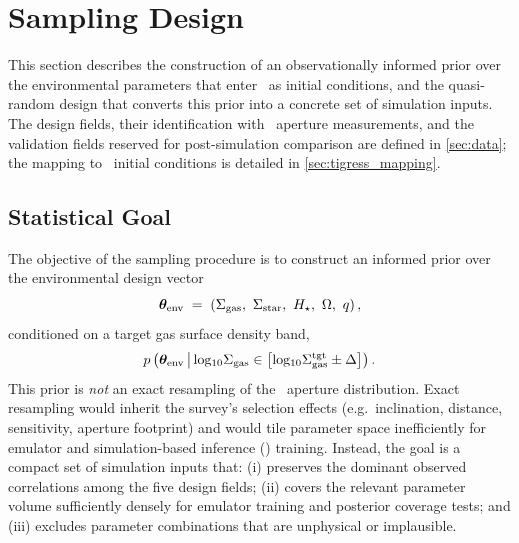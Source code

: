 \section{Sampling Design}
\label{sec:sampling}

This section describes the construction of an observationally informed prior
over the environmental parameters that enter \TIGRESS\ as initial conditions,
and the quasi-random design that converts this prior into a concrete set of
simulation inputs. The design fields, their identification with \PHANGS\
aperture measurements, and the validation fields reserved for post-simulation
comparison are defined in \autoref{sec:data}; the mapping to \TIGRESS\ initial
conditions is detailed in \autoref{sec:tigress_mapping}.

\subsection{Statistical Goal}
\label{sec:sampling:goal}

The objective of the sampling procedure is to construct an informed prior over
the environmental design vector
\begin{equation}
\thetaenv \;=\; \rbrackets{\Sgas,\ \Sstar,\ \Hstar,\ \Omrot,\ \qshear},
\label{eq:theta_env}
\end{equation}
conditioned on a target gas surface density band,
\begin{equation}
p\left({\boldsymbol{\theta}_{\rm env} \,\big|\, {\rm log_{\small 10}}\Sigma_{\rm gas} \in
\left[{{\rm log_{\small 10}}\Sigma_{\rm gas}^{\rm tgt} \pm \Delta}\right]}\right).
\label{eq:prior_definition}
\end{equation}
This prior is \emph{not} an exact resampling of the \PHANGS\ aperture
distribution. Exact resampling would inherit the survey's selection effects
(e.g.\ inclination, distance, sensitivity, aperture footprint) and would tile
parameter space inefficiently for emulator and simulation-based inference
(\SBI) training. Instead, the goal is a compact set of simulation inputs that:
(i) preserves the dominant observed correlations among the five design fields;
(ii) covers the relevant parameter volume sufficiently densely for emulator
training and posterior coverage tests; and (iii) excludes parameter
combinations that are unphysical or implausible.

